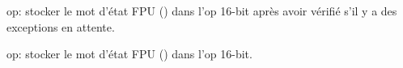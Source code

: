   \item[FSTSW] op: stocker le mot d'état FPU () dans l'op 16-bit
  après avoir vérifié s'il y a des exceptions en attente.
  \item[FNSTSW] op: stocker le mot d'état FPU () dans l'op 16-bit.

